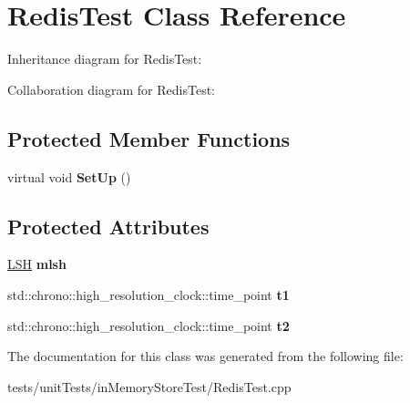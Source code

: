 \hypertarget{classRedisTest}{}\section{Redis\+Test Class Reference}
\label{classRedisTest}


Inheritance diagram for Redis\+Test\+:


Collaboration diagram for Redis\+Test\+:
\subsection*{Protected Member Functions}
\begin{DoxyCompactItemize}
\item 
virtual void {\bfseries Set\+Up} ()\hypertarget{classRedisTest_a009392f55a7a4659fe1a871edbc95787}{}\label{classRedisTest_a009392f55a7a4659fe1a871edbc95787}

\end{DoxyCompactItemize}
\subsection*{Protected Attributes}
\begin{DoxyCompactItemize}
\item 
\hyperlink{classLSH}{L\+SH} {\bfseries mlsh}\hypertarget{classRedisTest_a44a4609f667c3a8739f9ef1c3b534175}{}\label{classRedisTest_a44a4609f667c3a8739f9ef1c3b534175}

\item 
std\+::chrono\+::high\+\_\+resolution\+\_\+clock\+::time\+\_\+point {\bfseries t1}\hypertarget{classRedisTest_a7015aed975823a29d16af19939fe1b4e}{}\label{classRedisTest_a7015aed975823a29d16af19939fe1b4e}

\item 
std\+::chrono\+::high\+\_\+resolution\+\_\+clock\+::time\+\_\+point {\bfseries t2}\hypertarget{classRedisTest_a1a7ea49f38e01b9368c5c20e21fefeae}{}\label{classRedisTest_a1a7ea49f38e01b9368c5c20e21fefeae}

\end{DoxyCompactItemize}


The documentation for this class was generated from the following file\+:\begin{DoxyCompactItemize}
\item 
tests/unit\+Tests/in\+Memory\+Store\+Test/Redis\+Test.\+cpp\end{DoxyCompactItemize}
